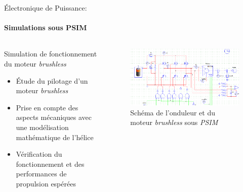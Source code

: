 \documentclass{beamer}
\begin{document}
	\begin{frame}{Électronique de Puissance:}
		\framesubtitle{ Simulations sous PSIM}
		\begin{columns}[T]
	  		\begin{column}{0.5\textwidth}
				Simulation de fonctionnement du moteur \textit{brushless}
				\begin{itemize}
					\item Étude du pilotage d'un moteur \textit{brushless}
					\item Prise en compte des aspects mécaniques avec une modélisation mathématique de l'hélice
					\item Vérification du fonctionnement et des performances de propulsion espérées
				\end{itemize}
	  		\end{column}
	  		\begin{column}{0.5\textwidth}
	  			\begin{figure}
	  				\begin{center}
	  					\includegraphics[height=0.35\textheight]{../Illus/simu_bldcm.png}
	  				\end{center}
	    			\caption{Schéma de l'onduleur et du moteur \textit{brushless} sous \textit{PSIM}}
	    		\end{figure}
	  		\end{column}
		\end{columns}
	\end{frame}	
	
\end{document}
